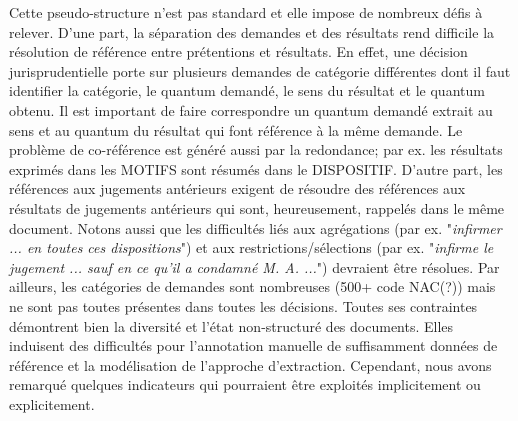  Cette pseudo-structure n'est pas standard et elle impose de nombreux défis à relever. D'une part, la séparation des demandes et des résultats rend difficile la résolution de référence entre prétentions et résultats. En effet, une décision jurisprudentielle porte sur plusieurs demandes de catégorie différentes dont il faut identifier la catégorie, le quantum demandé, le sens du résultat et le quantum obtenu. Il est important de faire correspondre un quantum demandé extrait au sens et au quantum du résultat qui font référence à la même demande. Le problème de co-référence est généré aussi par la redondance; par ex. les résultats exprimés dans les MOTIFS sont résumés dans le DISPOSITIF. D'autre part, les références aux jugements antérieurs exigent de résoudre des références aux résultats de jugements antérieurs qui sont, heureusement, rappelés dans le même document. Notons aussi que les difficultés liés aux agrégations (par ex. "\textit{infirmer ... en toutes ces dispositions}") et aux restrictions/sélections (par ex. "\textit{infirme le jugement ... sauf en ce qu'il a condamné M. A. ...}") devraient être résolues. Par ailleurs, les catégories de demandes sont nombreuses (500+ code NAC(?)) mais ne sont pas toutes présentes dans toutes les décisions. Toutes ses contraintes démontrent bien la diversité et l'état non-structuré des documents. Elles induisent des difficultés pour l'annotation manuelle de suffisamment données de référence et la modélisation de l'approche d'extraction. Cependant, nous avons remarqué quelques indicateurs qui pourraient être exploités implicitement ou explicitement.

